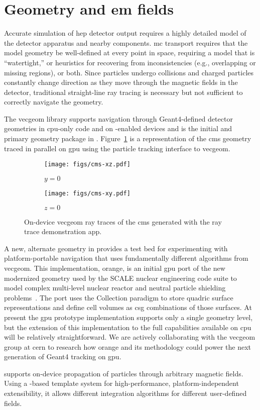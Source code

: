 \section{Geometry and \ac{em} fields}

Accurate simulation of \ac{hep} detector output requires a highly detailed model
of the detector apparatus and nearby components. \ac{mc} transport requires that
the model geometry be well-defined at every point in space, requiring a model
that is ``watertight,'' or heuristics for recovering from inconsistencies (e.g.,
overlapping or missing regions), or both. Since particles undergo collisions and
charged particles constantly change direction as they move through the magnetic
fields in the detector, traditional straight-line ray tracing is necessary but
not sufficient to correctly navigate the geometry.

The \acs{vecgeom} library supports navigation through Geant4-defined detector
geometries in \ac{cpu}-only code and on \cuda-enabled devices
\cite{apostolakis_towards_2015} and is the initial and primary geometry package
in \celeritas. Figure~\ref{fig:vecgeom-cms} is a representation of the \ac{cms}
geometry traced in parallel on \ac{gpu} using the \celeritas particle tracking
interface to \acs{vecgeom}.
\begin{figure}
  \centering%
  \begin{subfigure}{3in}%
    \centering%
    \texttt{[image: figs/cms-xz.pdf]}%
    \caption{$y=0$}%
  \end{subfigure}%
  \begin{subfigure}{3in}%
    \centering%
    \texttt{[image: figs/cms-xy.pdf]}%
    \caption{$z=0$}%
  \end{subfigure}
  \caption{On-device \acs{vecgeom} ray traces of the \acs{cms} generated with
the \celeritas ray trace demonstration app.}
\label{fig:vecgeom-cms}
\end{figure}

A new, alternate geometry in \celeritas provides a test bed for experimenting
with platform-portable navigation that uses fundamentally different algorithms
from \acs{vecgeom}. This implementation, \ac{orange}, is an initial \ac{gpu}
port of the new modernized geometry used by the SCALE nuclear engineering code
suite to model complex multi-level nuclear reactor and neutral particle
shielding problems~\cite{scale}. The \celeritas port uses the Collection
paradigm
%
%
to store quadric surface representations and define cell volumes as \ac{csg}
combinations of those surfaces. At present the \ac{gpu} prototype implementation
supports only a single geometry level, but the extension of this implementation
to the full capabilities available on \ac{cpu} will be relatively
straightforward. We are actively collaborating with the \acs{vecgeom} group at
\acs{cern} to research how \ac{orange} and its methodology could power the next
generation of Geant4 tracking on \ac{gpu}.

\celeritas supports on-device propagation of particles through arbitrary
magnetic fields. Using a \Cpp-based template system for high-performance,
platform-independent extensibility, it allows different integration algorithms
for different user-defined fields.
